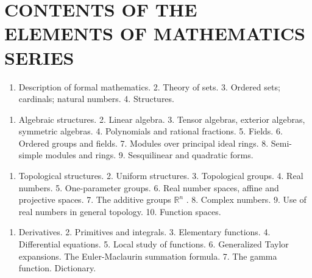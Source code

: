 \chapter*{CONTENTS OF THE ELEMENTS OF MATHEMATICS SERIES}
{}


\begin{enumerate}
\def\labelenumi{\arabic{enumi}.}
\tightlist
\item
  Description of formal mathematics. 2. Theory of sets. 3. Ordered sets; cardinals; natural numbers. 4. Structures.
\end{enumerate}


\begin{enumerate}
\def\labelenumi{\arabic{enumi}.}
\tightlist
\item
  Algebraic structures. 2. Linear algebra. 3. Tensor algebras, exterior algebras, symmetric algebras. 4. Polynomials and rational fractions. 5. Fields. 6. Ordered groups and fields. 7. Modules over principal ideal rings. 8. Semi-simple modules and rings. 9. Sesquilinear and quadratic forms.
\end{enumerate}


\begin{enumerate}
\def\labelenumi{\arabic{enumi}.}
\tightlist
\item
  Topological structures. 2. Uniform structures. 3. Topological groups. 4. Real numbers. 5. One-parameter groups. 6. Real number spaces, affine and projective spaces. 7. The additive groups \(\mathbb{R}^n\) . 8. Complex numbers. 9. Use of real numbers in general topology. 10. Function spaces.
\end{enumerate}


\begin{enumerate}
\def\labelenumi{\arabic{enumi}.}
\tightlist
\item
  Derivatives. 2. Primitives and integrals. 3. Elementary functions. 4. Differential equations. 5. Local study of functions. 6. Generalized Taylor expansions. The Euler-Maclaurin summation formula. 7. The gamma function. Dictionary.
\end{enumerate}


